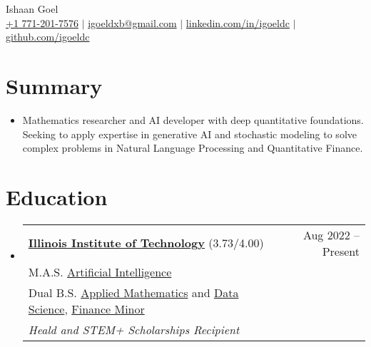 \documentclass[letterpaper,10pt]{article}
\newcommand\indentsize{10pt}
\newcommand\vspacesize{-10pt}
\newcommand{\resumeSubHeadingListStart}{\begin{itemize}[leftmargin=0.15in, label=]}
\newcommand{\resumeSubHeadingListEnd}{\end{itemize}}
\begin{document}
\begin{center}
    \huge Ishaan Goel \\ \vspace{2pt}
    \large
    \href{tel:17712017576}{+1 771-201-7576}
    $|$ \href{mailto:igoeldxb@gmail.com}{igoeldxb@gmail.com}
    $|$ \href{https://linkedin.com/in/igoeldc/}{linkedin.com/in/igoeldc}
    $|$ \href{https://github.com/igoeldc}{github.com/igoeldc}
\end{center}

\section{Summary}
  \resumeSubHeadingListStart
    \item{Mathematics researcher and AI developer with deep quantitative foundations. Seeking to apply expertise in generative AI and stochastic modeling to solve complex problems in Natural Language Processing and Quantitative Finance.}
  \resumeSubHeadingListEnd
\vspace{\vspacesize}

\newcommand{\resumeEducationHeading}[6]{
  \item
    \begin{tabular*}{0.97\textwidth}[t]{l@{\extracolsep{\fill}}r}
      \textbf{#1} {#2} & #3 \\
      \hspace{\indentsize} #4 \\
      \hspace{\indentsize} #5 \\
      \hspace{20pt} \textit{#6} \\
    \end{tabular*}
}

\section{Education}
  \resumeSubHeadingListStart
    \resumeEducationHeading
      {\href{https://www.iit.edu/}{Illinois Institute of Technology}}{(3.73/4.00)}{Aug 2022 -- Present}
      {M.A.S. \href{https://catalog.iit.edu/graduate/colleges/computing/computer-science/master-artificial-intelligence/\#overviewtext}{Artificial Intelligence}}
      {Dual B.S. \href{https://catalog.iit.edu/undergraduate/colleges/computing/applied-mathematics/bs/\#text}{Applied Mathematics} and \href{https://catalog.iit.edu/undergraduate/colleges/computing/computer-science/\#:~:text=The\%20B.S.\%20in\%20Data,be\%20successful\%20data\%20science\%20professionals.}{Data Science}, \href{https://catalog.iit.edu/undergraduate/colleges/business/minor-finance/\#:~:text=business\%20schools\%20worldwide.-,Required\%20Courses,-Course\%20List}{Finance Minor}}
      {Heald and STEM+ Scholarships Recipient}
  \resumeSubHeadingListEnd
  
\end{document}
